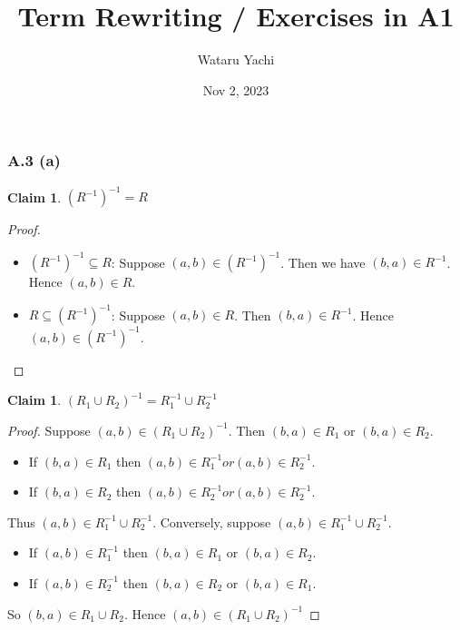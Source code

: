 \documentclass[12pt,aspectratio=169]{beamer}
\title{ Term Rewriting / Exercises in A1 }
\author{Wataru Yachi}
\institute{JAIST}
\date{Nov 2, 2023}
\theoremstyle{claim}
\newtheorem{claim}[theorem]{Claim}%
\begin{document}
\maketitle
\newcommand{\R}[3]{#1 \; #2 \; #3}

\begin{frame}
    \frametitle{A.3 (a)}
    \begin{claim}
      $(R^{-1})^{-1} = R$
    \end{claim}
    \begin{proof}
      \begin{itemize}
      \item $(R^{-1})^{-1} \subseteq R$:
      Suppose $(a,b) \in (R^{-1})^{-1}$.
      Then we have $(b,a) \in R^{-1}$.
      Hence $(a,b) \in R$.
      \item $R \subseteq (R^{-1})^{-1}$: Suppose $(a,b) \in R$.
      Then $(b,a) \in R^{-1}$. Hence $(a,b) \in (R^{-1})^{-1}$.
      \end{itemize}
    \end{proof}
\end{frame}

\begin{frame}
    \begin{claim}
        $(R_1 \cup R_2)^{-1} = R_1^{-1} \cup R_2^{-1}$
    \end{claim}
    \begin{proof}
        Suppose $(a,b) \in (R_1 \cup R_2)^{-1}$.
        Then $(b,a) \in R_1$ or $(b,a) \in R_2$.
        \begin{itemize}
          \item If $(b,a) \in R_1$ then $(a,b) \in R_1^{-1} or (a,b) \in R_2^{-1}$.
          \item If $(b,a) \in R_2$ then $(a,b) \in R_2^{-1} or (a,b) \in R_2^{-1}$.
        \end{itemize}
        Thus $(a,b) \in R_1^{-1} \cup R_2^{-1}$.
        Conversely, suppose $(a,b) \in R_1^{-1} \cup R_2^{-1}$.
        \begin{itemize}
          \item If $(a,b) \in R_1^{-1}$ then $(b,a) \in R_1$ or $(b,a) \in R_2$.
          \item If $(a,b) \in R_2^{-1}$ then $(b,a) \in R_2$ or $(b,a) \in R_1$.
        \end{itemize}
        So $(b,a) \in R_1 \cup R_2$. Hence $(a,b) \in (R_1 \cup R_2)^{-1}$
    \end{proof}
\end{frame}
\end{document}
